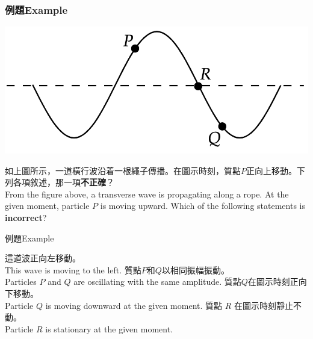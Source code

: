 \documentclass[beamer=true]{standalone}
\begin{document}
\begin{frame}
    \frametitle{例題Example}
    \par{\par\centering\includegraphics[width=.5\textwidth]{./img/ch1_2024-05-09-15-30-47.png}\par}
    如上圖所示，一道橫行波沿着一根繩子傳播。在圖示時刻，質點$P$正向上移動。下列各項敘述，那一項\textbf{不正確}？\\From the figure above, a transverse wave is propagating along a rope. At the given moment, particle $P$ is moving upward. Which of the following statements is \textbf{incorrect}?
\end{frame}

\begin{frame}[t]{例題Example}
    \begin{tasks}
        \task 這道波正向左移動。\\This wave is moving to the left.
        \task 質點$P$和$Q$以相同振幅振動。\\Particles $P$ and $Q$ are oscillating with the same amplitude.
        \task 質點$Q$在圖示時刻正向下移動。\\Particle $Q$ is moving downward at the given moment.
        \task 質點 $R$ 在圖示時刻靜止不動。\\Particle $R$ is stationary at the given moment.
    \end{tasks}
\end{frame}
\end{document}
